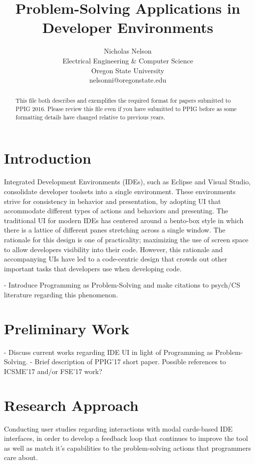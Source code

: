 \documentclass{ppig}
\title{Problem-Solving Applications in Developer Environments}
\author{Nicholas Nelson \\
  Electrical Engineering \& Computer Science \\
  Oregon State University \\
  nelsonni@oregonstate.edu}
\date{}
\begin{document}
\maketitle
\thispagestyle{empty}

\begin{abstract}
This file both describes and exemplifies the required format for papers submitted to PPIG 2016. Please review this file even if you have submitted to PPIG before as some formatting details have changed relative to previous years.
\end{abstract}

\section{Introduction}
Integrated Development Environments (IDEs), such as Eclipse and Visual Studio, consolidate developer toolsets into a single environment.
These environments strive for consistency in behavior and presentation, by adopting UI that accommodate different types of actions and behaviors and presenting.
The traditional UI for modern IDEs has centered around a bento-box style in which there is a lattice of different panes stretching across a single window.
The rationale for this design is one of practicality; maximizing the use of screen space to allow developers visibility into their code.
However, this rationale and accompanying UIs have led to a code-centric design that crowds out other important tasks that developers use when developing code.

- Introduce Programming as Problem-Solving and make citations to psych/CS literature regarding this phenomenon.

\section{Preliminary Work}
- Discuss current works regarding IDE UI in light of Programming as Problem-Solving.
- Brief description of PPIG'17 short paper. Possible references to ICSME'17 and/or FSE'17 work?

\section{Research Approach}
Conducting user studies regarding interactions with modal cards-based IDE interfaces, in order to develop a feedback loop that continues to improve the tool as well as match it's capabilities to the problem-solving actions that programmers care about.
\end{document}
